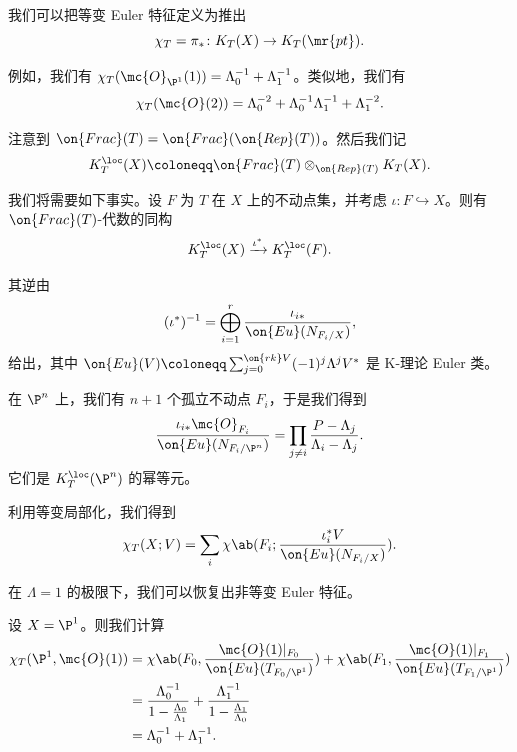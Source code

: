\begin{defn}
    我们可以把等变 Euler 特征定义为推出
    \[ \chi_T = \pi_* \colon K_T(X) \to K_T(\mr{pt}). \]
\end{defn}

\begin{exm}
    例如，我们有 \(\chi_T(\mc{O}_{\P^1}(1)) = \Lambda_0^{-1} + \Lambda_1^{-1}\)。类似地，我们有
    \[ \chi_T(\mc{O}(2)) = \Lambda_0^{-2} + \Lambda_0^{-1} \Lambda_1^{-1} + \Lambda_1^{-2}. \]
\end{exm}

\begin{notn}
    注意到 \(\on{Frac}(T) = \on{Frac}(\on{Rep}(T))\)。然后我们记
    \[ K_T^{\loc}(X) \coloneqq \on{Frac}(T) \otimes_{\on{Rep}(T)} K_T(X). \]
\end{notn}

我们将需要如下事实。设 \(F\) 为 \(T\) 在 \(X\) 上的不动点集，并考虑 \(\iota \colon F \hookrightarrow X\)。则有 \(\on{Frac}(T)\)-代数的同构
\[ K_T^{\loc}(X) \xrightarrow{\iota^*} K_T^{\loc}(F). \]

\begin{rmk}
    其逆由
    \[ (\iota^*)^{-1} = \bigoplus_{i=1}^r \frac{\iota_{i*}}{\on{Eu}(N_{F_i/X})}, \]
    给出，其中 \(\on{Eu}(V) \coloneqq \sum_{j = 0}^{\on{rk} V} (-1)^j \Lambda^j V^*\) 是 K-理论 Euler 类。
\end{rmk}

\begin{exm}
    在 \(\P^n\) 上，我们有 \(n+1\) 个孤立不动点 \(F_i\)，于是我们得到
    \[ \frac{\iota_{i*} \mc{O}_{F_i}}{\on{Eu}(N_{F_i/\P^n})} = \prod_{j \neq i} \frac{P - \Lambda_j}{\Lambda_i - \Lambda_j}. \]
    它们是 \(K_T^{\loc}(\P^n)\) 的幂等元。
\end{exm}

利用等变局部化，我们得到
\[ \chi_T(X; V) = \sum_i \chi\ab(F_i; \frac{\iota_i^* V}{\on{Eu}(N_{F_i/X})}). \]

\begin{rmk}
    在 \(\Lambda = 1\) 的极限下，我们可以恢复出非等变 Euler 特征。
\end{rmk}

\begin{exm}
    设 \(X = \P^1\)。则我们计算
    \begin{align*}
        \chi_T(\P^1, \mc{O}(1)) &= \chi\ab(F_0, \frac{\mc{O}(1)|_{F_0}}{\on{Eu}(T_{F_0/\P^1})}) + \chi\ab(F_1, \frac{\mc{O}(1)|_{F_1}}{\on{Eu}(T_{F_1/\P^1})}) \\
        &= \frac{\Lambda_0^{-1}}{1 - \frac{\Lambda_0}{\Lambda_1}} + \frac{\Lambda_1^{-1}}{1 - \frac{\Lambda_1}{\Lambda_0}} \\
        &= \Lambda_0^{-1} + \Lambda_1^{-1}. 
    \end{align*}
\end{exm}

